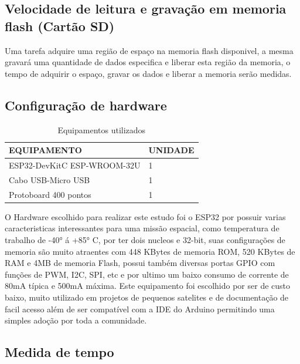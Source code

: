 \subsection{Velocidade de leitura e gravação em memoria flash (Cartão SD)}
Uma tarefa adquire uma região de espaço na memoria flash disponivel, a mesma gravará
uma quantidade de dados especifica e liberar esta região da memoria, o tempo de adquirir
o espaço, gravar os dados e liberar a memoria serão medidas.


\subsection{Configuração de hardware}

\begin{table}[]
	\centering
	\begin{tabular}{|l|l|}
		\hline
		\textbf{EQUIPAMENTO}                                            & \textbf{UNIDADE} \\
		\hline
		\textcolor[rgb]{0.125,0.129,0.141}{ESP32-DevKitC ESP-WROOM-32U} & 1                \\
		\hline
		\textcolor[rgb]{0.059,0.067,0.067}{Cabo USB-Micro USB}          & 1                \\
		\hline
		Protoboard 400 pontos                                           & 1                \\
		\hline
	\end{tabular}
	\caption{Equipamentos utilizados}
\end{table}

O Hardware escolhido para realizar este estudo foi o ESP32 por possuir varias caracteristicas 
interessantes para uma missão espacial, como temperatura de trabalho de -40° á +85° C, por 
ter dois nucleos e 32-bit, suas configurações de memoria são muito atraentes com 448 KBytes de 
memoria ROM, 520 KBytes de RAM e 4MB de memoria Flash, possui também diversas portas 
GPIO com funções de PWM, I2C, SPI, etc e por ultimo um baixo consumo de corrente de 80mA típica 
e 500mA máxima. Este equipamento foi escolhido por ser de custo baixo, muito utilizado em projetos 
de pequenos satelites e de documentação de facil acesso além de ser compatível com a IDE do Arduino 
permitindo uma simples adoção por toda a comunidade.



\subsection{Medida de tempo}

